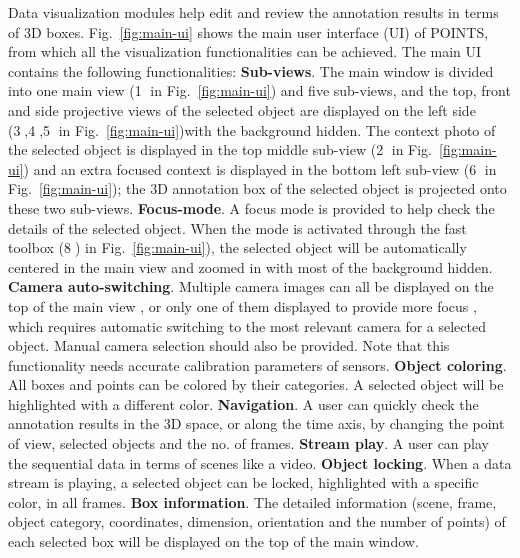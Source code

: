\documentclass[letterpaper, 10 pt, conference]{ieeeconf}  %
\begin{document}
Data visualization modules help edit and review the annotation results in terms of 3D boxes. 
Fig.~\ref{fig:main-ui} shows the main user interface (UI) of POINTS, from which all the visualization functionalities can be achieved.
The main UI contains the following functionalities: 
\textbf{Sub-views}. The main window is divided into one main view (\textcircled{1} in Fig.~\ref{fig:main-ui}) and five sub-views,  and the top, front and side projective views of the selected object are displayed on the left side (\textcircled{3},\textcircled{4},\textcircled{5} in Fig.~\ref{fig:main-ui})with the background hidden. The context photo of the selected object is displayed in the top middle sub-view (\textcircled{2} in Fig.~\ref{fig:main-ui}) and an extra focused context is displayed in the bottom left sub-view (\textcircled{6} in Fig.~\ref{fig:main-ui}); the 3D annotation box of the selected object is projected onto these two sub-views.
\textbf{Focus-mode}. A focus mode is provided to help check the details of the selected object. When the mode is activated through the fast toolbox (\textcircled{8}) in Fig.~\ref{fig:main-ui}), the selected object will be automatically centered in the main view and zoomed in with most of the background hidden.
\textbf{Camera auto-switching}. Multiple camera images can all be displayed on the top of the main view \cite{Zimmer20193DBA}, or only one of them displayed to provide more focus \cite{scale,Wang2019LATTEAL,pointatme}, which requires automatic switching to the most relevant camera for a selected object. Manual camera selection should also be provided. Note that this functionality needs accurate calibration parameters of sensors.
\textbf{Object coloring}. All boxes and points can be colored by their categories. A selected object will be highlighted with a different color. 
\textbf{Navigation}. \label{sec:navigation} A user can quickly check the annotation results in the 3D space, or along the time axis, by changing the point of view, selected objects and the no. of frames.
\textbf{Stream play}. \label{sec:streamplay} A user can play the sequential data in terms of scenes like a video.
\textbf{Object locking}. When a data stream is playing, a selected object can be locked, highlighted with a specific color, in all frames.
\textbf{Box information}. The detailed information (scene, frame, object category, coordinates, dimension, orientation and the number of points) of each selected box will be displayed on the top of the main window.
\end{document}

